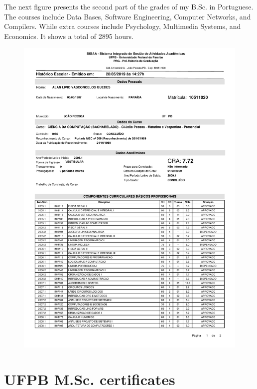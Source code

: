 \documentclass[10pt,a4paper,sans,colorlinks]{moderncv}
\begin{document}
The next figure presents the second part of the grades of my B.Sc. in Portuguese.
The courses include Data Bases, Software Engineering, Computer Networks, and Compilers.
While extra courses include Psychology, Multimedia Systems, and Economics.
It shows a total of 2895 hours.
\vspace{2em}
\begin{figure}
    \centering
    \includegraphics[align=t,width=\textwidth,height=0.6\paperheight, keepaspectratio=true,page=2]{certificates/bsc-grades.pdf}
\end{figure}

\newpage

\section{UFPB  M.Sc. certificates}
\end{document}
